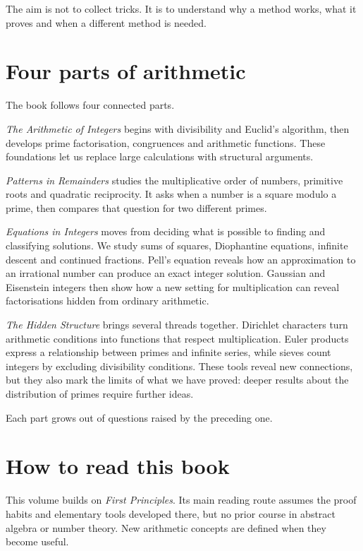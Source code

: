 The aim is not to collect tricks. It is to understand why a method works, what it proves and when a different method is needed.

\section*{Four parts of arithmetic}

The book follows four connected parts.

\emph{The Arithmetic of Integers} begins with divisibility and Euclid's algorithm, then develops prime factorisation, congruences and arithmetic functions. These foundations let us replace large calculations with structural arguments.

\emph{Patterns in Remainders} studies the multiplicative order of numbers, primitive roots and quadratic reciprocity. It asks when a number is a square modulo a prime, then compares that question for two different primes.

\emph{Equations in Integers} moves from deciding what is possible to finding and classifying solutions. We study sums of squares, Diophantine equations, infinite descent and continued fractions. Pell's equation reveals how an approximation to an irrational number can produce an exact integer solution. Gaussian and Eisenstein integers then show how a new setting for multiplication can reveal factorisations hidden from ordinary arithmetic.

\emph{The Hidden Structure} brings several threads together. Dirichlet characters turn arithmetic conditions into functions that respect multiplication. Euler products express a relationship between primes and infinite series, while sieves count integers by excluding divisibility conditions. These tools reveal new connections, but they also mark the limits of what we have proved: deeper results about the distribution of primes require further ideas.

Each part grows out of questions raised by the preceding one.

\section*{How to read this book}

This volume builds on \emph{First Principles}. Its main reading route assumes the proof habits and elementary tools developed there, but no prior course in abstract algebra or number theory. New arithmetic concepts are defined when they become useful.

